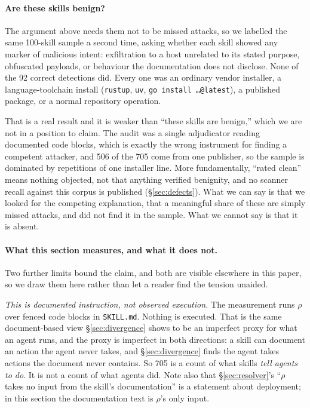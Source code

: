 \documentclass[10pt]{article}
\begin{document}
\paragraph{Are these skills benign?} The argument above needs them not to be missed
attacks, so we labelled the same 100-skill sample a second time, asking whether each
skill showed any marker of malicious intent: exfiltration to a host unrelated to its
stated purpose, obfuscated payloads, or behaviour the documentation does not
disclose. None of the 92 correct detections did. Every one was an ordinary vendor
installer, a language-toolchain install (\texttt{rustup}, \texttt{uv},
\texttt{go install \ldots @latest}), a published package, or a normal repository
operation.

That is a real result and it is weaker than ``these skills are benign,'' which we are
not in a position to claim. The audit was a single adjudicator reading documented
code blocks, which is exactly the wrong instrument for finding a competent attacker,
and 506 of the 705 come from one publisher, so the sample is dominated by repetitions
of one installer line. More fundamentally, ``rated clean'' means nothing objected, not
that anything verified benignity, and no scanner recall against this corpus is
published (\S\ref{sec:defects}). What we can say is that we looked for the competing
explanation, that a meaningful share of these are simply missed attacks, and did not
find it in the sample. What we cannot say is that it is absent.

\paragraph{What this section measures, and what it does not.} Two further limits bound
the claim, and both are visible elsewhere in this paper, so we draw them here rather
than let a reader find the tension unaided.

\emph{This is documented instruction, not observed execution.} The measurement runs
$\rho$ over fenced code blocks in \texttt{SKILL.md}. Nothing is executed. That is the
same document-based view \S\ref{sec:divergence} shows to be an imperfect proxy for
what an agent runs, and the proxy is imperfect in both directions: a skill can
document an action the agent never takes, and \S\ref{sec:divergence} finds the agent
takes actions the document never contains. So 705 is a count of what skills
\emph{tell agents to do}. It is not a count of what agents did. Note also that
\S\ref{sec:resolver}'s ``$\rho$ takes no input from the skill's documentation'' is a
statement about deployment; in this section the documentation text is $\rho$'s only
input.
\end{document}
